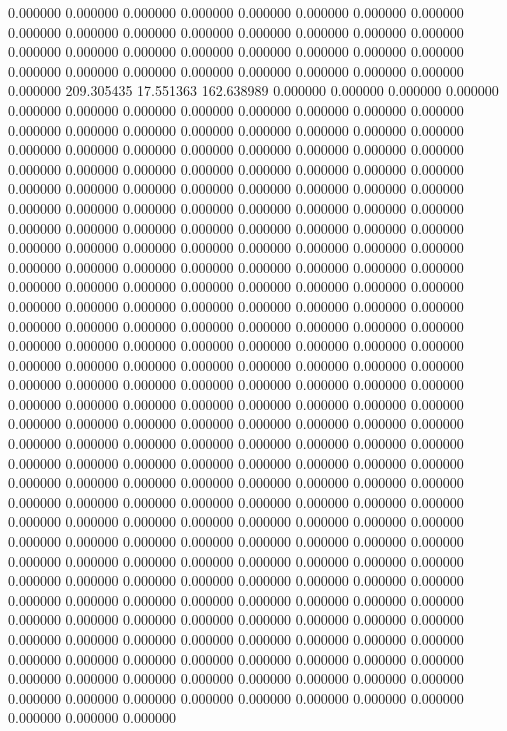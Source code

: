 0.000000 0.000000 0.000000
0.000000 0.000000 0.000000
0.000000 0.000000 0.000000
0.000000 0.000000 0.000000
0.000000 0.000000 0.000000
0.000000 0.000000 0.000000
0.000000 0.000000 0.000000
0.000000 0.000000 0.000000
0.000000 0.000000 0.000000
0.000000 0.000000 0.000000
0.000000 0.000000 0.000000
209.305435 17.551363 162.638989
0.000000 0.000000 0.000000
0.000000 0.000000 0.000000
0.000000 0.000000 0.000000
0.000000 0.000000 0.000000
0.000000 0.000000 0.000000
0.000000 0.000000 0.000000
0.000000 0.000000 0.000000
0.000000 0.000000 0.000000
0.000000 0.000000 0.000000
0.000000 0.000000 0.000000
0.000000 0.000000 0.000000
0.000000 0.000000 0.000000
0.000000 0.000000 0.000000
0.000000 0.000000 0.000000
0.000000 0.000000 0.000000
0.000000 0.000000 0.000000
0.000000 0.000000 0.000000
0.000000 0.000000 0.000000
0.000000 0.000000 0.000000
0.000000 0.000000 0.000000
0.000000 0.000000 0.000000
0.000000 0.000000 0.000000
0.000000 0.000000 0.000000
0.000000 0.000000 0.000000
0.000000 0.000000 0.000000
0.000000 0.000000 0.000000
0.000000 0.000000 0.000000
0.000000 0.000000 0.000000
0.000000 0.000000 0.000000
0.000000 0.000000 0.000000
0.000000 0.000000 0.000000
0.000000 0.000000 0.000000
0.000000 0.000000 0.000000
0.000000 0.000000 0.000000
0.000000 0.000000 0.000000
0.000000 0.000000 0.000000
0.000000 0.000000 0.000000
0.000000 0.000000 0.000000
0.000000 0.000000 0.000000
0.000000 0.000000 0.000000
0.000000 0.000000 0.000000
0.000000 0.000000 0.000000
0.000000 0.000000 0.000000
0.000000 0.000000 0.000000
0.000000 0.000000 0.000000
0.000000 0.000000 0.000000
0.000000 0.000000 0.000000
0.000000 0.000000 0.000000
0.000000 0.000000 0.000000
0.000000 0.000000 0.000000
0.000000 0.000000 0.000000
0.000000 0.000000 0.000000
0.000000 0.000000 0.000000
0.000000 0.000000 0.000000
0.000000 0.000000 0.000000
0.000000 0.000000 0.000000
0.000000 0.000000 0.000000
0.000000 0.000000 0.000000
0.000000 0.000000 0.000000
0.000000 0.000000 0.000000
0.000000 0.000000 0.000000
0.000000 0.000000 0.000000
0.000000 0.000000 0.000000
0.000000 0.000000 0.000000
0.000000 0.000000 0.000000
0.000000 0.000000 0.000000
0.000000 0.000000 0.000000
0.000000 0.000000 0.000000
0.000000 0.000000 0.000000
0.000000 0.000000 0.000000
0.000000 0.000000 0.000000
0.000000 0.000000 0.000000
0.000000 0.000000 0.000000
0.000000 0.000000 0.000000
0.000000 0.000000 0.000000
0.000000 0.000000 0.000000
0.000000 0.000000 0.000000
0.000000 0.000000 0.000000
0.000000 0.000000 0.000000
0.000000 0.000000 0.000000
0.000000 0.000000 0.000000
0.000000 0.000000 0.000000
0.000000 0.000000 0.000000
0.000000 0.000000 0.000000
0.000000 0.000000 0.000000
